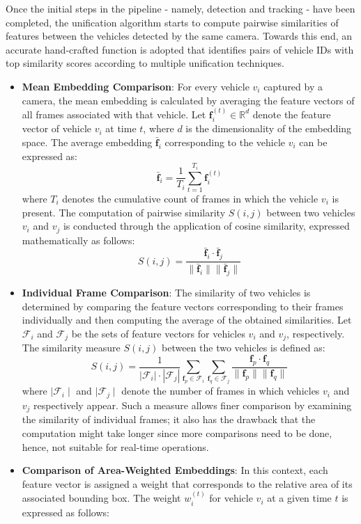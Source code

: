 Once the initial steps in the pipeline - namely, detection and tracking - have been completed, the unification algorithm starts to compute pairwise similarities of features between the vehicles detected by the same camera. Towards this end, an accurate hand-crafted function is adopted that identifies pairs of vehicle IDs with top similarity scores according to multiple unification techniques.
\begin{itemize}
    \item \textbf{Mean Embedding Comparison}: For every vehicle \( v_i \) captured by a camera, the mean embedding is calculated by averaging the feature vectors of all frames associated with that vehicle. Let \( \mathbf{f}_{i}^{(t)} \in \mathbb{R}^{d} \) denote the feature vector of vehicle \( v_i \) at time \( t \), where \( d \) is the dimensionality of the embedding space. The average embedding \( \bar{\mathbf{f}}_{i} \) corresponding to the vehicle \( v_i \) can be expressed as:
    \[
        \bar{\mathbf{f}}_{i} = \frac{1}{T_i} \sum_{t=1}^{T_i} \mathbf{f}_{i}^{(t)}
    \]
    where \( T_i \) denotes the cumulative count of frames in which the vehicle \( v_i \) is present.
    The computation of pairwise similarity \( S(i, j) \) between two vehicles \( v_i \) and \( v_j \) is conducted through the application of cosine similarity, expressed mathematically as follows:
    \[
        S(i, j) = \frac{\bar{\mathbf{f}}_{i} \cdot \bar{\mathbf{f}}_{j}}{\|\bar{\mathbf{f}}_{i}\| \|\bar{\mathbf{f}}_{j}\|}
    \]
    \item \textbf{Individual Frame Comparison}: The similarity of two vehicles is determined by comparing the feature vectors corresponding to their frames individually and then computing the average of the obtained similarities. Let $\mathcal{F}_i$ and $\mathcal{F}_j$ be the sets of feature vectors for vehicles $v_i$ and $v_j$, respectively. The similarity measure $S(i, j)$ between the two vehicles is defined as:
    \[
        S(i, j) = \frac{1}{|\mathcal{F}_i| \cdot |\mathcal{F}_j|} \sum_{\mathbf{f}_p \in \mathcal{F}_i} \sum_{\mathbf{f}_q \in \mathcal{F}_j} \frac{\mathbf{f}_p \cdot \mathbf{f}_q}{\|\mathbf{f}_p\| \|\mathbf{f}_q\|}
    \]
    where $\mid\mathcal{F}_i\mid$ and $\mid\mathcal{F}_j\mid$ denote the number of frames in which vehicles $v_i$ and $v_j$ respectively appear. Such a measure allows finer comparison by examining the similarity of individual frames; it also has the drawback that the computation might take longer since more comparisons need to be done, hence, not suitable for real-time operations.
    \item \textbf{Comparison of Area-Weighted Embeddings}: In this context, each feature vector is assigned a weight that corresponds to the relative area of its associated bounding box. The weight \( w_{i}^{(t)} \) for vehicle \( v_i \) at a given time \( t \) is expressed as follows:

\end{itemize}
